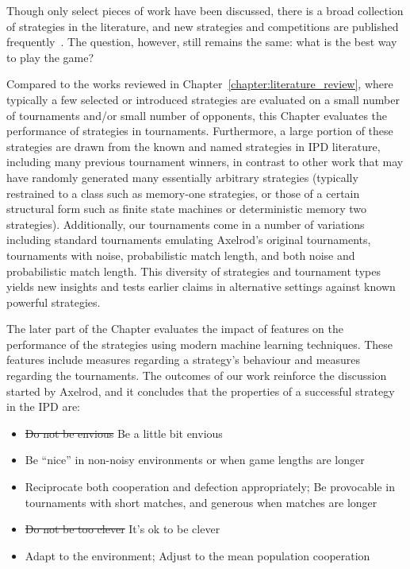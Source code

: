 Though only select pieces of work have been discussed, there is a broad collection
of strategies in the literature, and new strategies and competitions are
published frequently~\cite{Glynatsi2019}. The question, however, still remains
the same: what is the best way to play the game?

Compared to the works reviewed in Chapter~\ref{chapter:literature_review}, where
typically a few selected or introduced strategies are evaluated on a small
number of tournaments and/or small number of opponents, this Chapter evaluates
the performance of \numberofstrategies strategies in \numberofalltournaments
tournaments. Furthermore, a large portion of these strategies
are drawn from the known and named strategies in IPD literature, including many
previous tournament winners, in contrast to other work that may have randomly
generated many essentially arbitrary strategies (typically restrained to a class
such as memory-one strategies, or those of a certain structural form such as
finite state machines or deterministic memory two strategies). Additionally, our
tournaments come in a number of variations including standard tournaments
emulating Axelrod's original tournaments, tournaments with noise, probabilistic
match length, and both noise and probabilistic match length. This diversity of
strategies and tournament types yields new insights and tests earlier claims in
alternative settings against known powerful strategies. %

The later part of the Chapter evaluates the impact of features on the performance
of the strategies using modern machine learning techniques. These features
include measures regarding a strategy's behaviour and measures regarding the
tournaments. The outcomes of our work reinforce the discussion started by
Axelrod, and it concludes that the properties of a successful strategy in the
IPD are:

\begin{itemize}
    \item \st{Do not be envious} Be a little bit envious
    \item Be ``nice'' in non-noisy environments or when game lengths are longer
    \item Reciprocate both cooperation and defection appropriately;
    Be provocable in tournaments with short matches, and generous when matches are longer
    \item \st{Do not be too clever} It's ok to be clever
    \item Adapt to the environment; Adjust to the mean population cooperation
\end{itemize}

